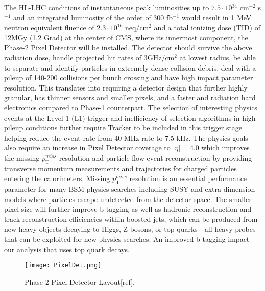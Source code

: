 The HL-LHC conditions of instantaneous peak luminosities up to $7.5\cdot{10}{^34}$ cm$^{-2}$ s$^{-1}$ and an integrated luminosity of the order of 300 fb$^{-1}$ would result in 1 MeV neutron equivalent fluence of $2.3\cdot{10}^{16}$ neq/cm$^2$ and a total ionizing dose (TID) of 12MGy (1.2 Grad) at the center of CMS, where its innermost component, the Phase-2 Pixel Detector will be installed.  The detector should survive the above radiation dose, handle projected hit rates of 3GHz/cm$^2$ at lowest radius, be able to separate and identify particles in extremely dense collision debris, deal with a pileup of 140-200 collisions per bunch crossing and have high impact parameter resolution. This translates into requiring a detector design that further highly granular, has thinner sensors and smaller pixels, and a faster and radiation hard electronics compared to Phase-1 counterpart. The selection of interesting physics events at the Level-1 (L1) trigger and inefficiency of selection algorithms in high pileup conditions further require Tracker to be included in this trigger stage helping reduce the event rate from 40 MHz rate to 7.5 kHz. The physics goals also require an increase in Pixel Detector coverage to $|\eta| = 4.0$ which improves the missing $p_{\text{T}}^{miss}$ resolution and particle-flow event reconstruction by providing transverse momentum measurements and trajectories for charged particles entering the calorimeters. Missing $p_{\text{T}}^{miss}$ resolution is an essential performance parameter for many BSM physics searches including SUSY and extra dimension models where particles escape undetected from the detector space. The smaller pixel size will further improve b-tagging as well as hadronic  reconstruction and track reconstruction efficiencies within boosted jets, which can be produced from new heavy objects decaying to Higgs, Z bosons, or top quarks - all heavy probes that can be exploited for new physics searches. An improved b-tagging impact our analysis that uses top quark decays.\\

\begin{figure}[H]
\begin{center}
\texttt{[image: PixelDet.png]} 
\caption{Phase-2 Pixel Detector Layout[ref].}
\label{PixelDet} 
\end{center}
\end{figure}

